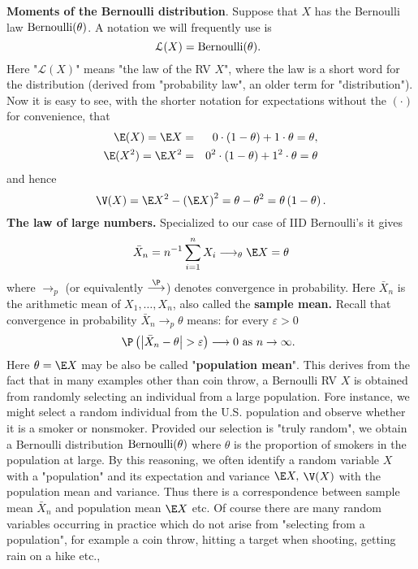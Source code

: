 \textbf{Moments of the Bernoulli distribution}. Suppose that $X$ has the
Bernoulli law $\mbox{{\rm Bernoulli}}(\theta)$. A notation we will frequently use is 
\begin{equation*}
\mathcal{L}(X)=\mbox{{\rm Bernoulli}}(\theta)\text{. }
\end{equation*}%
Here "$\mathcal{L}(X)$" means "the law of the RV $X$", where the law is
a short word for the distribution (derived from "probability law", an older
term for "distribution"). Now it is easy to see, with the shorter notation for expectations without the $(\cdot)$ for convenience, that 
\begin{eqnarray*}
\E (X) = \E X &=&0\cdot \left( 1-\theta\right) +1\cdot \theta=\theta, \\
\E (X^2) = \E X^{2} &=&0^{2}\cdot \left( 1-\theta\right) +1^{2}\cdot \theta=\theta
\end{eqnarray*}%
and hence 
\begin{equation*}
\V(X)=\E X^{2}-\left( \E X\right) ^{2}=\theta-\theta^{2}=\theta\left( 1-\theta\right) .
\end{equation*}%
\textbf{The law of large numbers. }Specialized to our case of IID
Bernoulli's it gives 
\begin{equation*}
\bar{X}_{n}=n^{-1}\sum_{i=1}^{n}X_{i}\longrightarrow _{\theta}\E X=\theta
\end{equation*}%
where $\longrightarrow_{p}$ (or equivalently $\overset{\P}{\longrightarrow}$) denotes convergence in probability. Here $\bar{X%
}_{n}$ is the arithmetic mean of $X_{1},\ldots ,X_{n}$, also called the 
\textbf{sample mean.} Recall that convergence in probability $\bar{X}%
_{n}\longrightarrow_{p} \theta$ means: for every $\varepsilon >0$ 
\begin{equation*}
\P \left( \left\vert \bar{X}_{n}-\theta\right\vert >\varepsilon \right)
\longrightarrow 0\text{ as }n\rightarrow \infty \text{. }
\end{equation*}%
Here $\theta=\E X$ may be also be called "\textbf{population mean}". This derives
from the fact that in many examples other than coin throw, a Bernoulli RV $X$ 
is obtained from randomly selecting an individual from a large
population. Fore instance, we might select a random individual from the U.S.
population and observe whether it is a smoker or nonsmoker. Provided our
selection is "truly random", we obtain a Bernoulli distribution $\mbox{{\rm Bernoulli}}(\theta)$ 
where $\theta$ is the proportion of smokers in the population at large. By
this reasoning, we often identify a random variable $X$ with a "population"
and its expectation and variance $\E X,$ $\V(X)$ with the population
mean and variance. Thus there is a correspondence between sample mean $\bar{X%
}_{n}$ and population mean $\E X$ etc. Of course there are many random
variables occurring in practice which do not arise from "selecting from a
population", for example a coin throw, hitting a target when shooting,
getting rain on a hike etc., \bigskip \bigskip

